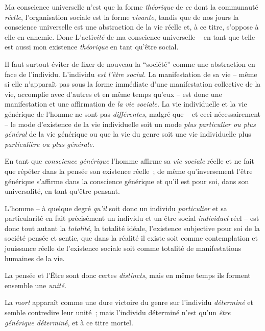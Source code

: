 \documentclass[french,twoside]{book} %
\begin{document}
Ma conscience universelle n’est que la forme \emph{théorique} de \emph{ce} dont la communauté \emph{réelle}, l’organisation sociale est la forme \emph{vivante}, tandis que de nos jours la conscience universelle est une abstraction de la vie réelle et, à ce titre, s’oppose à elle en ennemie. Donc L’acti\emph{vité} de ma conscience universelle – en tant que telle – est aussi mon existence \emph{théorique} en tant qu’être social.\par
Il faut surtout éviter de fixer de nouveau la “société” comme une abstraction en face de l’individu. L’individu \emph{est l’être social.} La manifestation de sa vie – même si elle n’apparaît pas sous la forme immédiate d’une manifestation collective de la vie, accomplie avec d’autres et en même temps qu’eux – est donc une manifestation et une affirmation de \emph{la vie sociale.} La vie individuelle et la vie générique de l’homme ne sont pas \emph{différentes}, malgré que – et ceci nécessairement – le mode d’existence de la vie individuelle soit un mode \emph{plus particulier ou plus général} de la vie générique ou que la vie du genre soit une vie individuelle plus \emph{particulière ou plus générale.}\par
En tant que \emph{conscience générique} l’homme affirme sa \emph{vie sociale} réelle et ne fait que répéter dans la pensée son existence réelle ; de même qu’inversement l’être générique s’affirme dans la conscience générique et qu’il est pour soi, dans son universalité, en tant qu’être pensant.\par
L’homme – à quelque degré \emph{qu’il} soit donc un individu \emph{particulier} et sa particularité en fait précisément un individu et un être social \emph{individuel} réel – est donc tout autant la \emph{totalité}, la totalité idéale, l’existence subjective pour soi de la société pensée et sentie, que dans la réalité il existe soit comme contemplation et jouissance réelle de l’existence sociale soit comme totalité de manifestations humaines de la vie.\par
La pensée et l’Être sont donc certes \emph{distincts}, mais en même temps ils forment ensemble une \emph{unité.}\par
La \emph{mort} apparaît comme une dure victoire du genre sur l’individu \emph{déterminé} et semble contredire leur unité ; mais l’individu déterminé n’est qu’un \emph{être générique déterminé}, et à ce titre mortel.\par
\end{document}
